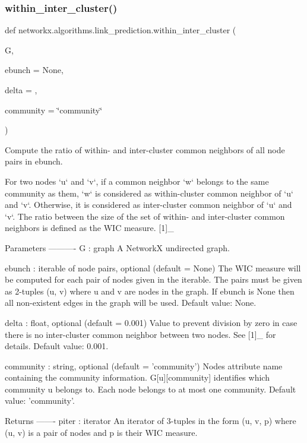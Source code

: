 \subsubsection{\texorpdfstring{within\+\_\+inter\+\_\+cluster()}{within\_inter\_cluster()}}
{\footnotesize\ttfamily def networkx.\+algorithms.\+link\+\_\+prediction.\+within\+\_\+inter\+\_\+cluster (\begin{DoxyParamCaption}\item[{}]{G,  }\item[{}]{ebunch = {\ttfamily None},  }\item[{}]{delta = {},  }\item[{}]{community = {\ttfamily \char`\"{}community\char`\"{}} }\end{DoxyParamCaption})}

\begin{DoxyVerb}Compute the ratio of within- and inter-cluster common neighbors
of all node pairs in ebunch.

For two nodes `u` and `v`, if a common neighbor `w` belongs to the
same community as them, `w` is considered as within-cluster common
neighbor of `u` and `v`. Otherwise, it is considered as
inter-cluster common neighbor of `u` and `v`. The ratio between the
size of the set of within- and inter-cluster common neighbors is
defined as the WIC measure. [1]_

Parameters
----------
G : graph
    A NetworkX undirected graph.

ebunch : iterable of node pairs, optional (default = None)
    The WIC measure will be computed for each pair of nodes given in
    the iterable. The pairs must be given as 2-tuples (u, v) where
    u and v are nodes in the graph. If ebunch is None then all
    non-existent edges in the graph will be used.
    Default value: None.

delta : float, optional (default = 0.001)
    Value to prevent division by zero in case there is no
    inter-cluster common neighbor between two nodes. See [1]_ for
    details. Default value: 0.001.

community : string, optional (default = 'community')
    Nodes attribute name containing the community information.
    G[u][community] identifies which community u belongs to. Each
    node belongs to at most one community. Default value: 'community'.

Returns
-------
piter : iterator
    An iterator of 3-tuples in the form (u, v, p) where (u, v) is a
    pair of nodes and p is their WIC measure.


\end{DoxyVerb}
